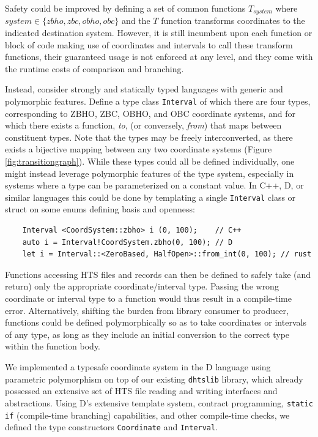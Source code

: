 \documentclass[12pt]{article}
\begin{document}
Safety could be improved by defining a set of common functions $T_{system}$ where $ system \in \{zbho, zbc, obho, obc\}$ and the $T$ function transforms coordinates to the indicated destination system. However, it is still incumbent upon each function or block of code making use of coordinates and intervals to call these transform functions, their guaranteed usage is not enforced at any level, and they come with the runtime costs of comparison and branching.

Instead, consider strongly and statically typed languages with generic and polymorphic features. Define a type class \texttt{Interval} of which there are four types, corresponding to ZBHO, ZBC, OBHO, and OBC coordinate systems, and for which there exists a function, \textit{to}, (or conversely, \textit{from}) that maps between constituent types. Note that the types may be freely interconverted, as there exists a bijective mapping between any two coordinate systems (Figure \ref{fig:transitiongraph}). While these types could all be defined individually, one might instead leverage polymorphic features of the type system, especially in systems where a type can be parameterized on a constant value. In C++, D, or similar languages this could be done by templating a single \texttt{Interval} class or struct on some enums defining basis and openness:

\begin{verbatim}
    Interval <CoordSystem::zbho> i (0, 100);    // C++
    auto i = Interval!CoordSystem.zbho(0, 100); // D
    let i = Interval::<ZeroBased, HalfOpen>::from_int(0, 100); // rust
\end{verbatim}

Functions accessing HTS files and records can then be defined to safely take (and return) only the appropriate coordinate/interval type. Passing the wrong coordinate or interval type to a function would thus result in a compile-time error. Alternatively, shifting the burden from library consumer to producer, functions could be defined polymorphically so as to take coordinates or intervals of any type, as long as they include an initial conversion to the correct type within the function body.


We implemented a typesafe coordinate system in the D language using parametric polymorphism on top of our existing \texttt{dhtslib}\cite{gregory_dhtslib_nodate} library, which already possessed an extensive set of HTS file reading and writing interfaces and abstractions. Using D’s extensive template system, contract programming, \texttt{static if} (compile-time branching) capabilities, and other compile-time checks, we defined the type constructors \texttt{Coordinate} and \texttt{Interval}.
\end{document}
